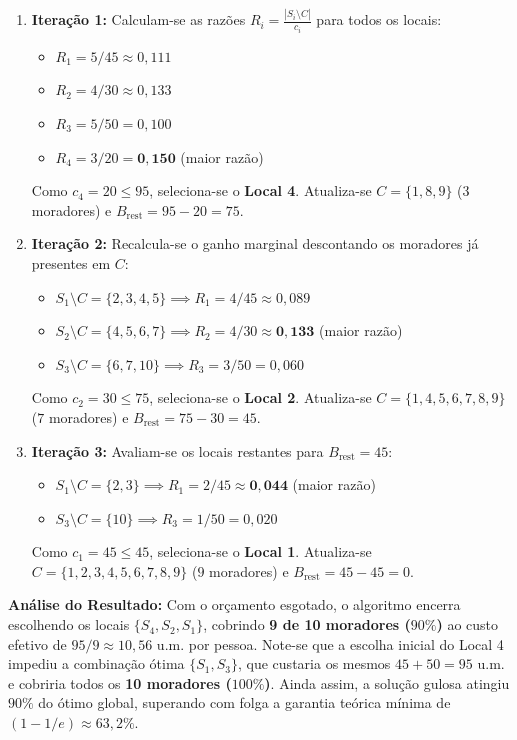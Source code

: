 \begin{enumerate}
    \item \textbf{Iteração 1:} Calculam-se as razões $R_i = \frac{|S_i \setminus C|}{c_i}$ para todos os locais:
    \begin{itemize}
        \item $R_1 = 5 / 45 \approx 0{,}111$
        \item $R_2 = 4 / 30 \approx 0{,}133$
        \item $R_3 = 5 / 50 = 0{,}100$
        \item $R_4 = 3 / 20 = \mathbf{0{,}150}$ (maior razão)
    \end{itemize}
    Como $c_4 = 20 \le 95$, seleciona-se o \textbf{Local 4}. Atualiza-se $C = \{1, 8, 9\}$ ($3$ moradores) e $B_{\text{rest}} = 95 - 20 = 75$.

    \item \textbf{Iteração 2:} Recalcula-se o ganho marginal descontando os moradores já presentes em $C$:
    \begin{itemize}
        \item $S_1 \setminus C = \{2, 3, 4, 5\} \implies R_1 = 4 / 45 \approx 0{,}089$
        \item $S_2 \setminus C = \{4, 5, 6, 7\} \implies R_2 = 4 / 30 \approx \mathbf{0{,}133}$ (maior razão)
        \item $S_3 \setminus C = \{6, 7, 10\} \implies R_3 = 3 / 50 = 0{,}060$
    \end{itemize}
    Como $c_2 = 30 \le 75$, seleciona-se o \textbf{Local 2}. Atualiza-se $C = \{1, 4, 5, 6, 7, 8, 9\}$ ($7$ moradores) e $B_{\text{rest}} = 75 - 30 = 45$.

    \item \textbf{Iteração 3:} Avaliam-se os locais restantes para $B_{\text{rest}} = 45$:
    \begin{itemize}
        \item $S_1 \setminus C = \{2, 3\} \implies R_1 = 2 / 45 \approx \mathbf{0{,}044}$ (maior razão)
        \item $S_3 \setminus C = \{10\} \implies R_3 = 1 / 50 = 0{,}020$
    \end{itemize}
    Como $c_1 = 45 \le 45$, seleciona-se o \textbf{Local 1}. Atualiza-se $C = \{1, 2, 3, 4, 5, 6, 7, 8, 9\}$ ($9$ moradores) e $B_{\text{rest}} = 45 - 45 = 0$.
\end{enumerate}

\textbf{Análise do Resultado:} Com o orçamento esgotado, o algoritmo encerra escolhendo os locais $\{S_4, S_2, S_1\}$, cobrindo \textbf{9 de 10 moradores ($90\%$)} ao custo efetivo de $95 / 9 \approx 10{,}56$ u.m. por pessoa. Note-se que a escolha inicial do Local 4 impediu a combinação ótima $\{S_1, S_3\}$, que custaria os mesmos $45 + 50 = 95$ u.m. e cobriria todos os \textbf{10 moradores ($100\%$)}. Ainda assim, a solução gulosa atingiu $90\%$ do ótimo global, superando com folga a garantia teórica mínima de $(1 - 1/e) \approx 63{,}2\%$.

